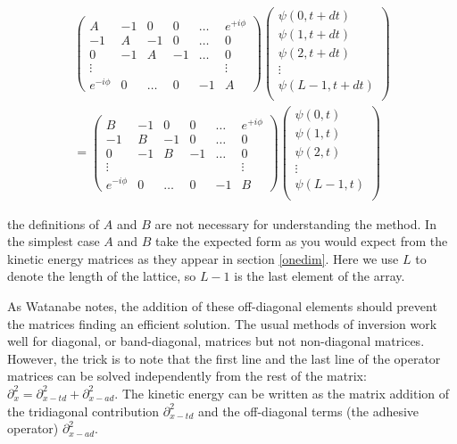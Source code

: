 \begin{eqnarray}
\left(\begin{array}{cccccc}
A & -1 & 0  & 0 &\ldots & e^{+i\phi} \\
-1 & A & -1 & 0 &\ldots & 0 \\
0 & -1 & A  & -1&\ldots & 0 \\
\vdots & & & & & \vdots \\
e^{-i\phi}& 0 & \ldots & 0 & -1 & A
\end{array}\right)
\left(\begin{array}{c}
\psi(0,t + dt) \\
\psi(1,t + dt) \\
\psi(2,t + dt) \\
\vdots \\
\psi(L-1,t + dt) \\
\end{array}\right) \\
=
\left(\begin{array}{cccccc}
B & -1 & 0  & 0 &\ldots & e^{+i\phi} \\
-1 & B & -1 & 0 &\ldots & 0 \\
0 & -1 & B  & -1&\ldots & 0 \\
\vdots & & & & & \vdots \\
e^{-i\phi}& 0 & \ldots & 0 & -1 & B
\end{array}\right)
\left(\begin{array}{c}
\psi(0,t) \\
\psi(1,t) \\
\psi(2,t) \\
\vdots \\
\psi(L-1,t) \\
\end{array}\right)
\end{eqnarray}

\noindent the definitions of $A$ and $B$ are not necessary for understanding the method. In the simplest case $A$ and $B$ take the expected form as you would expect from the kinetic energy matrices as they appear in section \ref{onedim}. Here we use $L$ to denote the length of the lattice, so $L-1$ is the last element of the array.

As Watanabe notes, the addition of these off-diagonal elements should prevent the matrices finding an efficient solution. The usual methods of inversion work well for diagonal, or band-diagonal, matrices but not non-diagonal matrices. However, the trick is to note that the first line and the last line of the operator matrices can be solved independently from the rest of the matrix: $\partial^2_x = \partial^2_{x-td} + \partial^2_{x-ad}$. The kinetic energy can be written as the matrix addition of the tridiagonal contribution $\partial^2_{x-td}$ and the off-diagonal terms (the adhesive operator) $\partial^2_{x-ad}$.

